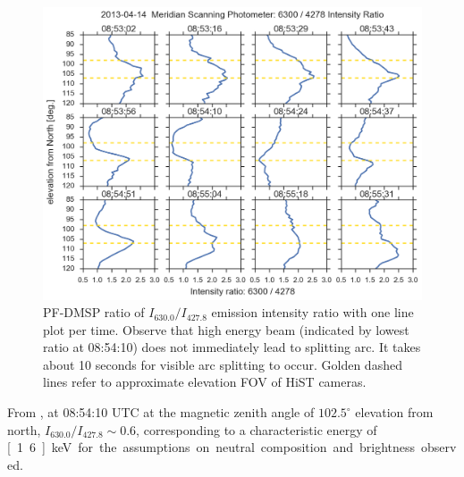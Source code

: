 \begin{figure}
    \includegraphics[width=0.9\columnwidth]{gfx/2013-04-14T0854/msp_ratio}
    \caption{PF-DMSP ratio of $I_{630.0}/I_{427.8}$ emission intensity ratio with one line plot per time. Observe that high energy beam (indicated by lowest ratio at 08:54:10) does not immediately lead to splitting arc. It takes about 10 seconds for visible arc splitting to occur. Golden dashed lines refer to approximate elevation FOV of HiST cameras.}
    \label{fig:shedratioplot0854}
\end{figure}
From \citet{rees1974}, at 08:54:10 UTC at the magnetic zenith angle of $102.5^\circ$ elevation from north, $I_{630.0}/I_{427.8} \sim 0.6$, corresponding to a characteristic energy of \unit[1.6]{keV} for the assumptions on neutral composition and brightness observed.

